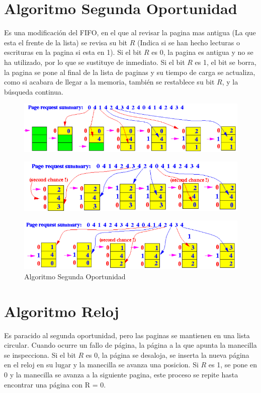 \documentclass{article}
\begin{document}
{\centering \section*{Algoritmo Segunda Oportunidad}}
Es una modificación del FIFO, en el que al revisar la pagina mas antigua (La que esta el frente de la lista) se revisa su bit $R$ (Indica si se han hecho lecturas o escrituras en la pagina si esta en 1). Si el bit $R$ es 0, la pagina es antigua y no se ha utilizado, por lo que se sustituye de inmediato. Si el bit $R$ es 1, el bit se borra, la pagina se pone al final de la lista de paginas y su tiempo de carga se actualiza, como si acabara de llegar a la memoria, también se restablece su bit $R$, y la búsqueda continua.

\begin{figure}[H]
	\centering
	\includegraphics[scale=0.7]{img/sop1.png}
\end{figure}
\begin{figure}[H]
	\centering
	\includegraphics[scale=0.6]{img/sop2.png}
\end{figure}
\begin{figure}[H]
	\centering
	\includegraphics[scale=0.6]{img/sop3.png}
	\caption{Algoritmo Segunda Oportunidad}
\end{figure}


{\centering \section*{Algoritmo Reloj}}
Es paracido al segunda oportunidad, pero las paginas se mantienen en una lista circular.
Cuando ocurre un fallo de página, la página a la que apunta la manecilla se inspecciona. Si el bit $R$ es 0, la página se desaloja, se inserta la nueva página en el reloj en su lugar y la manecilla se avanza una posicion. Si $R$ es 1, se pone en 0 y la manecilla se avanza a la siguiente pagina, este proceso se repite hasta encontrar una página con R = 0.
\end{document}
